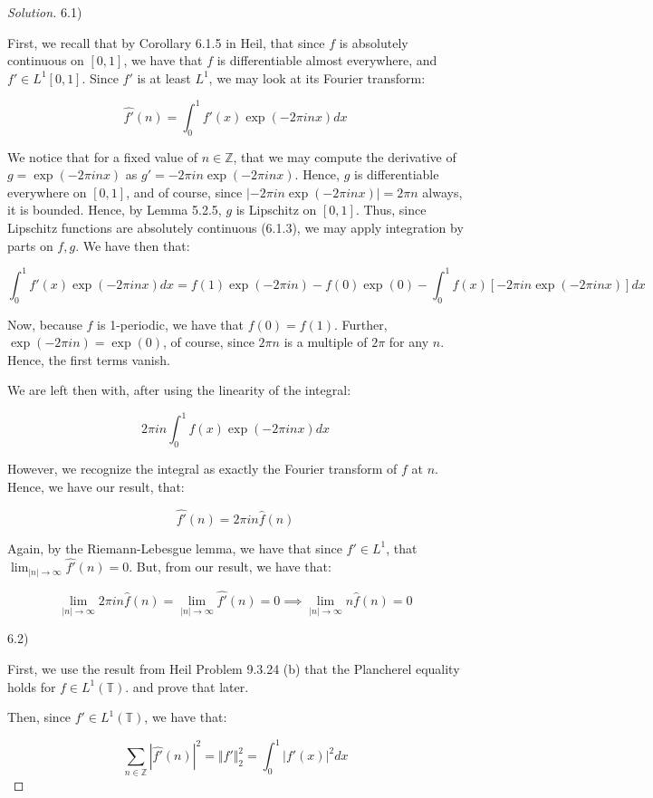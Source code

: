 \documentclass[10pt]{article}
\begin{document}
\begin{proof}[Solution]

6.1)

First, we recall that by Corollary 6.1.5 in Heil, that since $f$ is absolutely continuous on $[0,1]$, we have that $f$ is differentiable almost everywhere, and $f' \in L^1[0,1]$. Since $f'$ is at least $L^1$, we may look at its Fourier transform:

$$ \hat{f'}(n) = \int_0^1 f'(x) \exp(-2\pi i n x) dx $$

We notice that for a fixed value of $n \in \mathbb{Z}$, that we may compute the derivative of $g =\exp(-2 \pi i nx)$ as $g' =- 2 \pi i n\exp(-2\pi i nx) $. Hence, $g$ is differentiable everywhere on $[0,1]$, and of course, since $|- 2 \pi i n\exp(-2\pi i nx)| = 2\pi n$ always, it is bounded. Hence, by Lemma 5.2.5, $g$ is Lipschitz on $[0,1]$. Thus, since Lipschitz functions are absolutely continuous (6.1.3), we may apply integration by parts on $f, g$. We have then that:

$$ \int_0^1 f'(x) \exp(-2\pi i nx ) dx = f(1) \exp(-2\pi i n) - f(0) \exp(0) - \int_0^1 f(x) [ - 2 \pi i n \exp(-2\pi i nx)] dx $$

Now, because $f$ is 1-periodic, we have that $f(0) = f(1)$. Further, $\exp(-2\pi in ) = \exp(0)$, of course, since $2\pi n$ is a multiple of $2\pi $ for any $n$. Hence, the first terms vanish.

We are left then with, after using the linearity of the integral:

$$ 2 \pi i n \int_0^1 f(x) \exp(- 2 \pi i nx) dx $$

However, we recognize the integral as exactly the Fourier transform of $f$ at $n$. Hence, we have our result, that:

$$ \hat{f'}(n) = 2 \pi in \hat{f}(n) $$

Again, by the Riemann-Lebesgue lemma, we have that since $f' \in L^1$, that $\lim_{|n| \to \infty} \hat{f'}(n) = 0 $. But, from our result, we have that:

$$ \lim_{|n| \to \infty} 2 \pi i n \hat{f}(n) = \lim_{|n| \to \infty} \hat{f'}(n) =  0 \implies \lim_{|n| \to \infty} n \hat{f}(n) = 0 $$

6.2)

First, we use the result from Heil Problem 9.3.24 (b) that the Plancherel equality holds for $f \in L^1(\mathbb{T})$. and prove that later.

Then, since $f' \in L^1(\mathbb{T})$, we have that:

$$ \sum_{n \in \mathbb{Z}} | \hat{f'}(n)|^2 = \Vert f' \Vert_2^2 = \int_0^1 |f'(x)|^2 dx $$


\end{proof}
\end{document}
